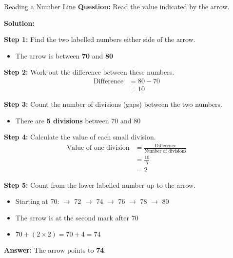 \documentclass[12pt,a4paper]{article}
\begin{document}
\begin{examplebox}{Reading a Number Line}
\textbf{Question:} Read the value indicated by the arrow.

\begin{center}
\end{center}

\textbf{Solution:}

\textbf{Step 1:} Find the two labelled numbers either side of the arrow.
\begin{itemize}
\item The arrow is between \textbf{70} and \textbf{80}
\end{itemize}

\textbf{Step 2:} Work out the difference between these numbers.
\begin{align*}
\text{Difference} &= 80 - 70 \\
&= 10
\end{align*}

\textbf{Step 3:} Count the number of divisions (gaps) between the two numbers.
\begin{itemize}
\item There are \textbf{5 divisions} between 70 and 80
\end{itemize}

\textbf{Step 4:} Calculate the value of each small division.
\begin{align*}
\text{Value of one division} &= \frac{\text{Difference}}{\text{Number of divisions}} \\
&= \frac{10}{5} \\
&= 2
\end{align*}

\textbf{Step 5:} Count from the lower labelled number up to the arrow.
\begin{itemize}
\item Starting at 70:  $\to$ 72 $\to$ 74 $\to$ 76 $\to$ 78 $\to$ 80
\item The arrow is at the second mark after 70
\item $70 + (2 \times 2) = 70 + 4 = \boxed{74}$
\end{itemize}

\textbf{Answer:} The arrow points to \textbf{74}.
\end{examplebox}
\end{document}
